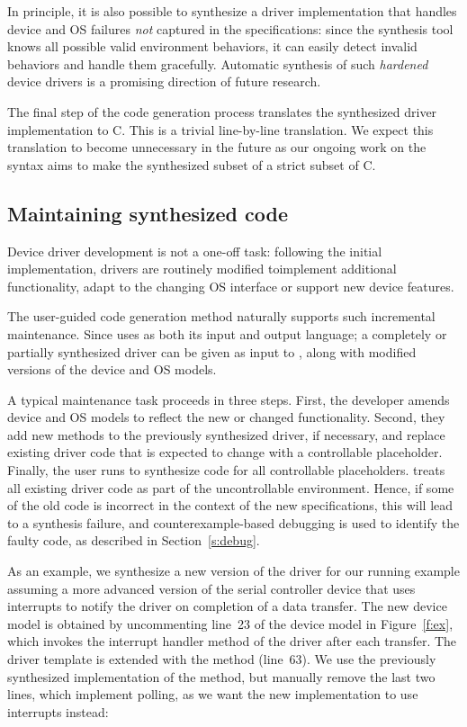 In principle, it is also possible to synthesize a driver implementation that handles device and OS failures \emph{not} captured in the specifications: since the synthesis tool knows all possible valid environment behaviors, it can easily detect invalid behaviors and handle them gracefully.  Automatic synthesis of such \emph{hardened} device drivers is a promising direction of future research.

The final step of the code generation process translates the synthesized driver implementation to C.  This is a trivial line-by-line translation.  We expect this translation to become unnecessary in the future as our ongoing work on the \tsl syntax aims to make the synthesized subset of \tsl a strict subset of C.

\subsection{Maintaining synthesized code~~} 
Device driver development is not a one-off task: following the initial implementation, drivers are routinely modified toimplement additional functionality, adapt to the changing OS interface or support new device features.

The user-guided code generation method naturally supports such incremental maintenance. Since \termite uses \tsl as both its input and output language;  a completely or partially synthesized driver can be given as input to \termite, along with modified versions of the device and OS models.

A typical maintenance task proceeds in three steps.  First, the developer amends device and OS models to reflect the new or changed functionality.  Second, they add new methods to the previously synthesized driver, if necessary, and replace existing driver code that is expected to change with a controllable  placeholder.  Finally, the user runs \termite to synthesize code for all controllable placeholders.  \termite treats all existing driver code as part of the uncontrollable environment.  Hence, if some of the old code is incorrect in the context of the new specifications, this will lead to a synthesis failure, and counterexample-based debugging is used to identify the faulty code, as described in Section~\ref{s:debug}.

As an example, we synthesize a new version of the driver for our running example assuming a more advanced version of the serial controller device that uses interrupts to notify the driver on completion of a data transfer.  The new device model is obtained by uncommenting line~23 of the device model in Figure~\ref{f:ex}, which invokes the interrupt handler method of the driver after each transfer.  The driver template is extended with the  method (line~63).  We use the previously synthesized implementation of the  method, but manually remove the last two lines, which implement polling, as we want the new implementation to use interrupts instead:

